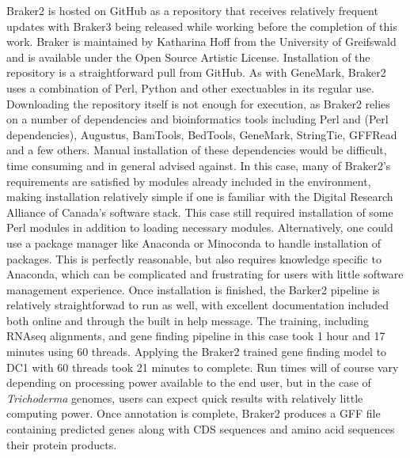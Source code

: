 Braker2\cite{Bruna2021} is hosted on GitHub as a repository that
receives relatively frequent updates with Braker3 being released while
working before the completion of this work. Braker is maintained by
Katharina Hoff from the University of Greifswald and is available
under the Open Source Artistic License. Installation of the repository
is a straightforward pull from GitHub. As with GeneMark, Braker2 uses
a combination of Perl, Python and other exectuables in its regular
use. Downloading the repository itself is not enough for execution, as
Braker2 relies on a number of dependencies and bioinformatics tools
including Perl and (Perl dependencies), Augustus, BamTools, BedTools,
GeneMark, StringTie, GFFRead and a few others. Manual installation of
these dependencies would be difficult, time consuming and in general
advised against. In this case, many of Braker2's requirements are
satisfied by modules already included in the environment, making
installation relatively simple if one is familiar with the Digital
Research Alliance of Canada's software stack. This case still required
installation of some Perl modules in addition to loading necessary
modules. Alternatively, one could use a package manager like Anaconda
or Minoconda to handle installation of packages. This is perfectly
reasonable, but also requires knowledge specific to Anaconda, which
can be complicated and frustrating for users with little software
management experience. Once installation is finished, the Barker2
pipeline is relatively straightforwad to run as well, with excellent
documentation included both online and through the built in help
message. The training, including RNAseq alignments, and gene finding
pipeline in this case took 1 hour and 17 minutes using 60
threads. Applying the Braker2 trained gene finding model to DC1 with
60 threads took 21 minutes to complete. Run times will of course vary
depending on processing power available to the end user, but in the
case of \textit{Trichoderma} genomes, users can expect quick results
with relatively little computing power. Once annotation is complete,
Braker2 produces a GFF file containing predicted genes along with CDS
sequences and amino acid sequences their protein products.


